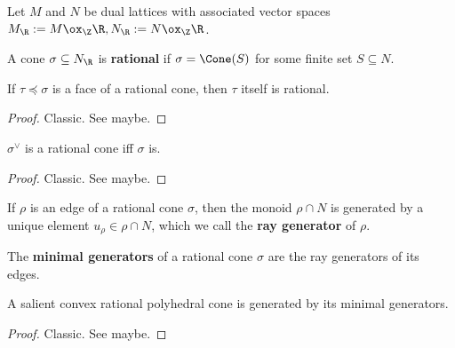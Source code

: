 Let $M$ and $N$ be dual lattices with associated vector spaces $M_\R := M \ox_\Z \R, N_\R := N \ox_\Z \R$.


\begin{definition}
  \label{1-2-14-rat-cone}

  A cone $\sigma \subseteq N_\R$ is {\bf rational} if $\sigma = \Cone(S)$ for some finite set $S \subseteq N$.
\end{definition}


\begin{lemma}
  \label{1-2-14-face-rat-cone}

  If $\tau \preceq \sigma$ is a face of a rational cone, then $\tau$ itself is rational.
\end{lemma}
\begin{proof}
  \uses{}

  Classic. See \cite{Oda_1988} maybe.
\end{proof}


\begin{lemma}
  \label{1-2-14-dual-rat-cone}

  $\sigma^\vee$ is a rational cone iff $\sigma$ is.
\end{lemma}
\begin{proof}
  \uses{}

  Classic. See \cite{Oda_1988} maybe.
\end{proof}


\begin{definition}
  \label{1-2-ray-gen}

  If $\rho$ is an edge of a rational cone $\sigma$, then the monoid $\rho \cap N$ is generated by a unique element $u_\rho \in \rho \cap N$, which we call the {\bf ray generator} of $\rho$.
\end{definition}


\begin{definition}
  \label{1-2-min-gen}

  The {\bf minimal generators} of a rational cone $\sigma$ are the ray generators of its edges.
\end{definition}


\begin{lemma}
  \label{1-2-15-cone-hull-min-gen}

  A salient convex rational polyhedral cone is generated by its minimal generators.
\end{lemma}
\begin{proof}
  \uses{}

  Classic. See \cite{Oda_1988} maybe.
\end{proof}


